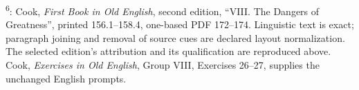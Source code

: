 \textsuperscript{6}: Cook, \emph{First Book in Old English}, second edition, “VIII. The Dangers of Greatness”, printed 156.1–158.4, one-based PDF 172–174. Linguistic text is exact; paragraph joining and removal of source cues are declared layout normalization. The selected edition’s attribution and its qualification are reproduced above. Cook, \emph{Exercises in Old English}, Group VIII, Exercises 26–27, supplies the unchanged English prompts.

\endgroup

